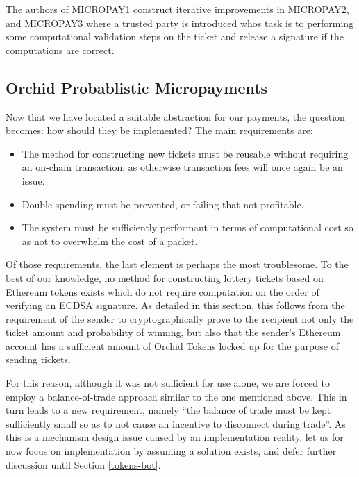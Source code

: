 The authors of MICROPAY1 construct iterative improvements in MICROPAY2, and MICROPAY3 where a trusted party is introduced whos task is to performing some computational validation steps on the ticket and release a signature if the computations are correct.

\subsection{Orchid Probablistic Micropayments}
\label{orchid-payments}

Now that we have located a suitable abstraction for our payments, the question becomes: how should they be implemented? The main requirements are:

\begin{itemize}
\item The method for constructing new tickets must be reusable without requiring an on-chain transaction, as otherwise transaction fees will once again be an issue.
\item Double spending must be prevented, or failing that not profitable.
\item The system must be sufficiently performant in terms of computational cost so as not to overwhelm the cost of a packet.
\end{itemize}

Of those requirements, the last element is perhaps the most troublesome. To the best of our knowledge, no method for constructing lottery tickets based on Ethereum tokens exists which do not require computation on the order of verifying an ECDSA signature. As detailed in this section, this follows from the requirement of the sender to cryptographically prove to the recipient not only the ticket amount and probability of winning, but also that the sender's Ethereum account has a sufficient amount of Orchid Tokens locked up for the purpose of sending tickets.

For this reason, although it was not sufficient for use alone, we are forced to employ a balance-of-trade approach similar to the one mentioned above. This in turn leads to a new requirement, namely ``the balance of trade must be kept sufficiently small so as to not cause an incentive to disconnect during trade''. As this is a mechanism design issue caused by an implementation reality, let us for now focus on implementation by assuming a solution exists, and defer further discussion until Section \ref{tokens-bot}.

